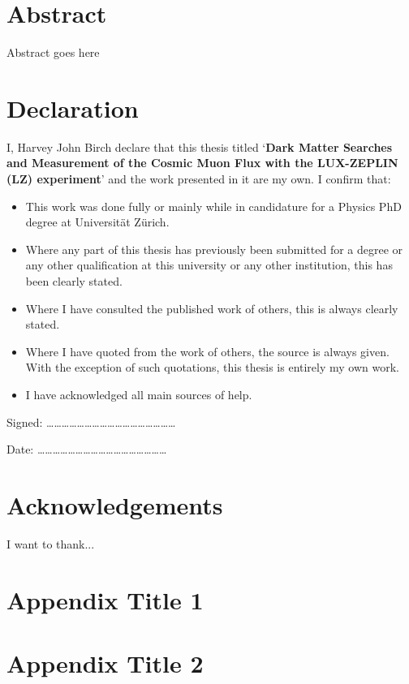 \documentclass[a4paper,11pt,usegeometry]{scrreprt} %
\begin{document}
\chapter*{Abstract}
Abstract goes here


\newpage\null\thispagestyle{empty}\newpage

\chapter*{Declaration}
\vskip 1in
I, Harvey John Birch declare that this thesis titled ‘\textbf{Dark Matter Searches and Measurement of the Cosmic Muon Flux with the LUX-ZEPLIN (LZ) experiment}’ and the work presented in it are my own. I confirm that:
\bigbreak

\begin{itemize}
\item This work was done fully or mainly while in candidature for a Physics PhD degree at Universit\"at Z\"urich.
\item Where any part of this thesis has previously been submitted for a degree or any other qualification at this university or any other institution, this has been clearly stated.
\item Where I have consulted the published work of others, this is always clearly stated.
\item Where I have quoted from the work of others, the source is always given. With the exception of such quotations, this thesis is entirely my own work.
\item I have acknowledged all main sources of help.
\end{itemize}
\vskip 2in

Signed:
……………………………………………
\bigskip

Date:
……………………………………………

\newpage\null\thispagestyle{empty}\newpage

\chapter*{Acknowledgements}
I want to thank...

\tableofcontents
\listoffigures	%
\listoftables  %
\clearpage
{}
\doublespacing %








\printbibliography[heading=bibintoc,title={Bibliography}]
\appendix
\chapter{Appendix Title 1}

\chapter{Appendix Title 2}

\end{document}
